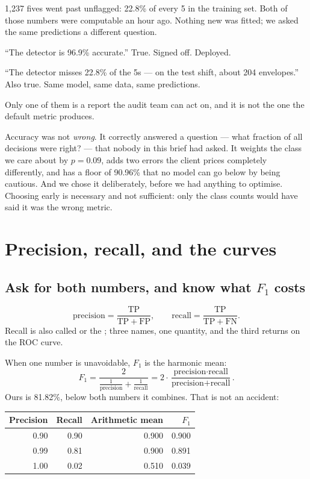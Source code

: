 \documentclass[11pt,a4paper]{article}
\begin{document}
1{,}237 fives went past unflagged: 22.8\% of every 5 in the training set. Both
of those numbers were computable an hour ago. Nothing new was fitted; we asked
the same predictions a different question.

\begin{failbox}[title={Failure condition --- two sentences, both true}]
``The detector is 96.9\% accurate.'' True. Signed off. Deployed.

``The detector misses 22.8\% of the 5s --- on the test shift, about 204
envelopes.'' Also true. Same model, same data, same predictions.

Only one of them is a report the audit team can act on, and it is not the one
the default metric produces.
\end{failbox}

Accuracy was not \emph{wrong}. It correctly answered a question --- what
fraction of all decisions were right? --- that nobody in this brief had asked.
It weights the class we care about by $p = 0.09$, adds two errors the client
prices completely differently, and has a floor of 90.96\% that no model can go
below by being cautious. And we chose it deliberately, before we had anything
to optimise. Choosing early is necessary and not sufficient: only the class
counts would have said it was the wrong metric.

\section{Precision, recall, and the curves}

\subsection{Ask for both numbers, and know what $F_1$ costs}

\[ \text{precision} = \frac{\mathrm{TP}}{\mathrm{TP}+\mathrm{FP}},
   \qquad
   \text{recall} = \frac{\mathrm{TP}}{\mathrm{TP}+\mathrm{FN}}. \]
Recall is also called  or the ;
three names, one quantity, and the third returns on the ROC curve.

When one number is unavoidable, $F_1$ is the harmonic mean:
\[ F_1 = \frac{2}{\frac{1}{\text{precision}} + \frac{1}{\text{recall}}}
       = 2\cdot\frac{\text{precision}\cdot\text{recall}}
                    {\text{precision}+\text{recall}}. \]
Ours is 81.82\%, below both numbers it combines. That is not an accident:

\begin{center}
\small
\begin{tabular}{rrrr}
\toprule
\textbf{Precision} & \textbf{Recall} & \textbf{Arithmetic mean} &
\textbf{$F_1$} \\
\midrule
0.90 & 0.90 & 0.900 & 0.900 \\
0.99 & 0.81 & 0.900 & 0.891 \\
1.00 & 0.02 & 0.510 & 0.039 \\
\bottomrule
\end{tabular}
\end{center}
\end{document}

